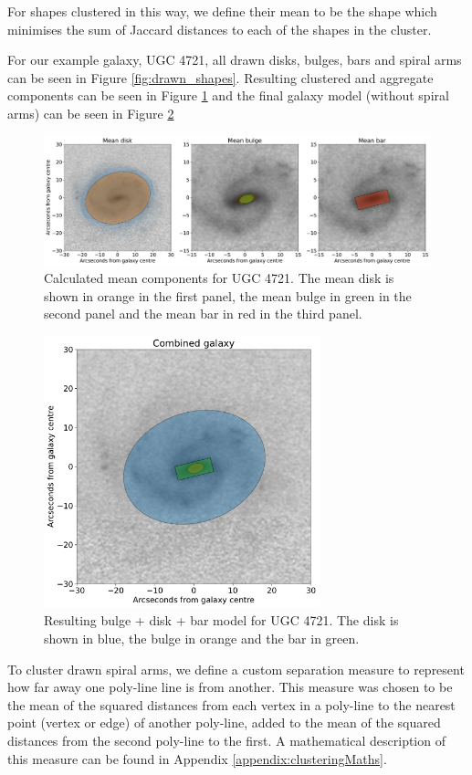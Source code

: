 \documentclass[../main.tex]{subfiles}
\begin{document}
For shapes clustered in this way, we define their mean to be the shape which minimises the sum of Jaccard distances to each of the shapes in the cluster.

For our example galaxy, UGC 4721, all drawn disks, bulges, bars and spiral arms can be seen in Figure \ref{fig:drawn_shapes}. Resulting clustered and aggregate components can be seen in Figure \ref{fig:mean_shapes} and the final galaxy model (without spiral arms) can be seen in Figure \ref{fig:aggregate_model}

\begin{figure}
  \includegraphics[width=17.3cm]{images__method/mean_shapes.pdf}
  \caption{Calculated mean components for UGC 4721. The mean disk is shown in orange in the first panel, the mean bulge in green in the second panel and the mean bar in red in the third panel.}
  \label{fig:mean_shapes}
\end{figure}


\begin{figure}
  \includegraphics[width=8cm]{images__method/aggregate_model.pdf}
  \caption{Resulting bulge + disk + bar model for UGC 4721. The disk is shown in blue, the bulge in orange and the bar in green.}
  \label{fig:aggregate_model}
\end{figure}

To cluster drawn spiral arms, we define a custom separation measure to represent how far away one poly-line line is from another. This measure was chosen to be the mean of the squared distances from each vertex in a poly-line to the nearest point (vertex or edge) of another poly-line, added to the mean of the squared distances from the second poly-line to the first. A mathematical description of this measure can be found in Appendix \ref{appendix:clusteringMaths}.
\end{document}
